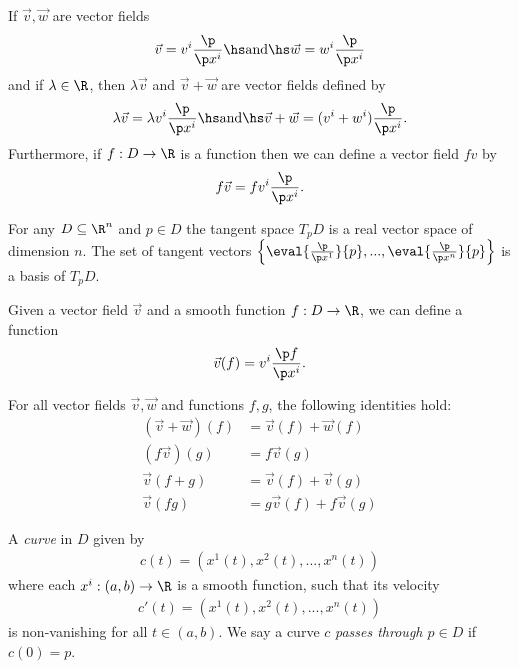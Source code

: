 \documentclass{article}
\begin{document}
\begin{definition}
	If $\vec v,\vec w$ are vector fields
	\begin{align*}
		\vec v = v^i \frac{\p}{\p x^i}\hs\text{and}\hs \vec w = w^i \frac{\p }{\p x^i}
	\end{align*}
	and if $\lambda\in\R$, then $\lambda \vec v$ and $\vec v+\vec w$ are vector fields defined by
	\begin{align*}
		\lambda \vec v = \lambda v^i \frac{\p }{\p x^i}\hs\text{and}\hs
		\vec v+\vec w = (v^i+w^i)\frac{\p }{\p x^i}.
	\end{align*}
	Furthermore, if $f:D\to\R$ is a function then we can define a vector field
	$fv$ by
	\begin{align*}
		f\vec v = fv^i\frac{\p }{\p x^i}.
	\end{align*}
\end{definition}

\begin{theorem}[Notes 4.4]
	For any $D\subseteq \R^n$ and $p\in D$ the tangent space $T_pD$ is a real vector space
	of dimension $n$. The set of tangent vectors
	$\left\lbrace\eval{\frac{\p }{\p x^1}}{p}, ...,\eval{\frac{\p }{\p x^n}}{p}\right\rbrace$
	is a basis of $T_pD$.
\end{theorem}

\begin{definition}
	Given a vector field $\vec v$ and a smooth function $f:D\to\R$,
	we can define a function
	\begin{align*}
		\vec v(f) = v^i\frac{\p f}{\p x^i}.
	\end{align*}
\end{definition}

\begin{proposition}[Notes 4.7]
	For all vector fields $\vec v,\vec w$ and functions $f,g$, the following identities hold:
	\begin{align*}
		(\vec v+\vec w)(f) & = \vec v(f) + \vec w(f)   \\
		(f\vec v)(g)       & = f\vec v(g)              \\
		\vec v(f+g)        & = \vec v(f) + \vec v(g)   \\
		\vec v(fg)         & = g\vec v(f) + f\vec v(g)
	\end{align*}
\end{proposition}

\begin{definition}
	A \emph{curve} in $D$ given by
	\begin{align*}
		c(t) = (x^1(t), x^2(t), ..., x^n(t))
	\end{align*}
	where each $x^i:(a,b)\to\R$ is a smooth function, such that its velocity
	\begin{align*}
		c'(t)=(x^1(t), x^2(t), ..., x^n(t))
	\end{align*}
	is non-vanishing for all $t\in(a,b)$.
	We say a curve $c$ \emph{passes through $p\in D$} if $c(0)=p$.
\end{definition}
\end{document}
